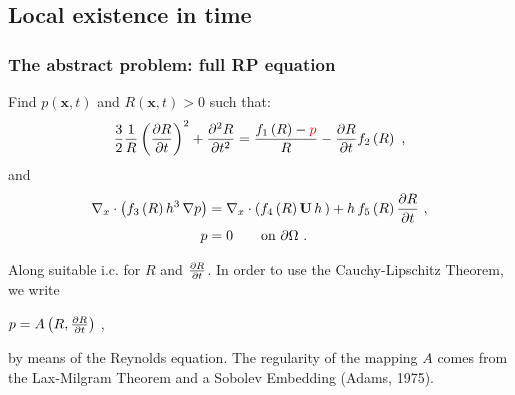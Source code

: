 \documentclass[10pt,aspectratio=169]{beamer}
\begin{document}

\subsection{Local existence in time}
\setcounter{showSlideNumbers}{0}
\begin{frame}[noframenumbering]
\tableofcontents[
currentsection,
currentsubsection,
subsectionstyle=show/shaded/hide
]
\end{frame}
\setcounter{showSlideNumbers}{1}


\begin{frame}
\frametitle{The abstract problem: full RP equation}\vspace*{0.5cm}
Find $p(\mathbf{x},t)$ and $R(\mathbf{x},t)>0$ such that:
\begin{equation*}
\frac{3}{2}\frac{1}{R}\left(\frac{\partial R}{\partial t}\right)^2+\frac{\partial^2 R}{\partial t^2}=\frac{f_1\left(R\right)-{\color{red}p}}{R}-\frac{\partial R}{\partial t}f_2\left(R\right)~,
\end{equation*}
and
\begin{align*}
\begin{split}
\nabla_x\cdot \left(f_3\left(R\right) h^3\,\nabla p\right)&=\nabla_x\cdot \left(f_4\left(R\right)\mathbf{U}\,h\,\right)+h\,f_5\left(R\right)\frac{\partial R}{\partial t}~,\\
p&=0 \qquad\mbox{on } \partial \Omega~.
\end{split}
\end{align*}

Along suitable i.c. for $R$ and $\frac{\partial R}{\partial t}$. In order to use the Cauchy-Lipschitz Theorem, we write
\begin{center}
 {\color{red}$p=A\left(R,\frac{\partial R}{\partial t}\right)$} ,
\end{center}
by means of the Reynolds equation. The regularity of the mapping $A$ comes from the Lax-Milgram Theorem and a Sobolev Embedding (Adams, 1975).
\end{frame} 

\end{document}

